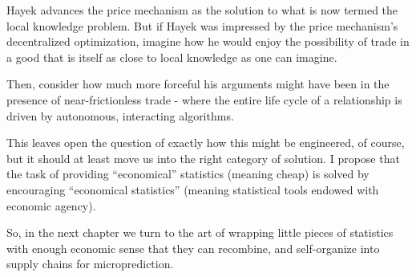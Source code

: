 Hayek advances the price mechanism as the solution to what is now termed the local knowledge problem. But if Hayek was impressed by the price mechanism's decentralized optimization, imagine how he would enjoy the possibility of trade in a good that is itself as close to local knowledge as one can imagine. 

Then, consider how much more forceful his arguments might have been in the presence of near-frictionless trade - where the entire life cycle of a relationship is driven by autonomous, interacting algorithms.  

This leaves open the question of exactly how this might be engineered, of course, but it should at least move us into the right category of solution. I propose that the task of providing ``economical'' statistics (meaning cheap) is solved by encouraging ``economical statistics'' (meaning statistical tools endowed with economic agency).  

So, in the next chapter we turn to the art of wrapping little pieces of statistics with enough economic sense that they can recombine, and self-organize into supply chains for microprediction.  





 












